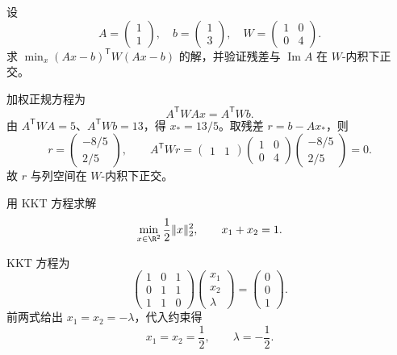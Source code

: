 \begin{exercise}[level=advanced]
设
\[
A=\begin{pmatrix}1\\1\end{pmatrix},
\quad b=\begin{pmatrix}1\\3\end{pmatrix},
\quad W=\begin{pmatrix}1&0\\0&4\end{pmatrix}.
\]
求 $\min_x(Ax-b)^{\mathsf T}W(Ax-b)$ 的解，并验证残差与 $\operatorname{Im}A$ 在 $W$-内积下正交。
\begin{solution}
加权正规方程为
\[
A^{\mathsf T}WAx=A^{\mathsf T}Wb.
\]
由 $A^{\mathsf T}WA=5$、$A^{\mathsf T}Wb=13$，得
$x_*=13/5$。取残差 $r=b-Ax_*$，则
\[
r=\begin{pmatrix}-8/5\\2/5\end{pmatrix},
\qquad
A^{\mathsf T}Wr
=\begin{pmatrix}1&1\end{pmatrix}
\begin{pmatrix}1&0\\0&4\end{pmatrix}
\begin{pmatrix}-8/5\\2/5\end{pmatrix}=0.
\]
故 $r$ 与列空间在 $W$-内积下正交。
\end{solution}
\end{exercise}

\begin{exercise}[level=advanced]
用 KKT 方程求解
\[
\min_{x\in\R^2}\frac12\lVert x\rVert_2^2,
\qquad x_1+x_2=1.
\]
\begin{solution}
KKT 方程为
\[
\begin{pmatrix}1&0&1\\0&1&1\\1&1&0\end{pmatrix}
\begin{pmatrix}x_1\\x_2\\\lambda\end{pmatrix}
=\begin{pmatrix}0\\0\\1\end{pmatrix}.
\]
前两式给出 $x_1=x_2=-\lambda$，代入约束得
\[
x_1=x_2=\frac12,
\qquad \lambda=-\frac12.
\]
\end{solution}
\end{exercise}

